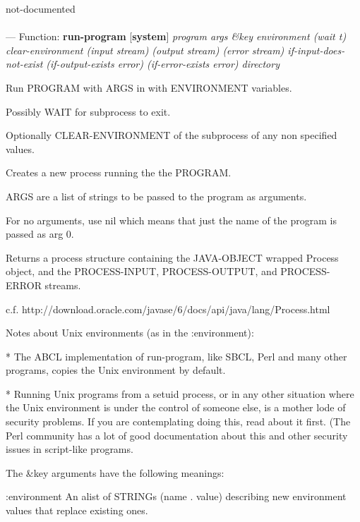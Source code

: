 \begin{adjustwidth}{5em}{5em}
not-documented
\end{adjustwidth}

\paragraph{}
\label{SYSTEM:RUN-PROGRAM}
--- Function: \textbf{run-program} [\textbf{system}] \textit{program args \&key environment (wait t) clear-environment (input stream) (output stream) (error stream) if-input-does-not-exist (if-output-exists error) (if-error-exists error) directory}

\begin{adjustwidth}{5em}{5em}
Run PROGRAM with ARGS in with ENVIRONMENT variables.

Possibly WAIT for subprocess to exit.

Optionally CLEAR-ENVIRONMENT of the subprocess of any non specified values.

Creates a new process running the the PROGRAM.

ARGS are a list of strings to be passed to the program as arguments.

For no arguments, use nil which means that just the name of the
program is passed as arg 0.

Returns a process structure containing the JAVA-OBJECT wrapped Process
object, and the PROCESS-INPUT, PROCESS-OUTPUT, and PROCESS-ERROR streams.

c.f. http://download.oracle.com/javase/6/docs/api/java/lang/Process.html

Notes about Unix environments (as in the :environment):

    * The ABCL implementation of run-program, like SBCL, Perl and many
      other programs, copies the Unix environment by default.

    * Running Unix programs from a setuid process, or in any other
      situation where the Unix environment is under the control of
      someone else, is a mother lode of security problems. If you are
      contemplating doing this, read about it first. (The Perl
      community has a lot of good documentation about this and other
      security issues in script-like programs.

The \&key arguments have the following meanings:

:environment
    An alist of STRINGs (name . value) describing new
    environment values that replace existing ones.


\end{adjustwidth}
